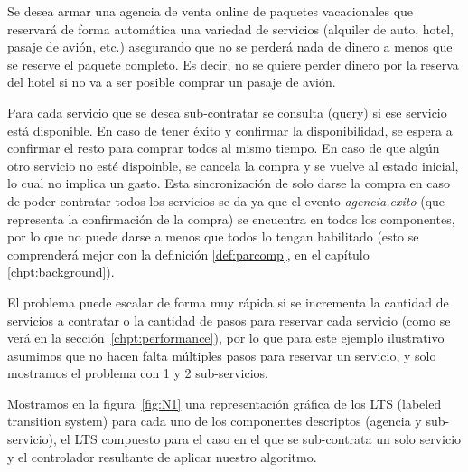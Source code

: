 Se desea armar una agencia de venta online de paquetes vacacionales que reservará de forma automática una variedad de servicios (alquiler de auto, hotel, pasaje de avión, etc.) asegurando que no se perderá nada de dinero a menos que se reserve el paquete completo. Es decir, no se quiere perder dinero por la reserva del hotel si no va a ser posible comprar un pasaje de avión.

Para cada servicio que se desea sub-contratar se consulta (query) si ese servicio está disponible. En caso de tener éxito y confirmar la disponibilidad, se espera a confirmar el resto para comprar todos al  mismo tiempo. En caso de que algún otro servicio no esté dispoinble, se cancela la compra y se vuelve al estado inicial, lo cual no implica un gasto. Esta sincronización de solo darse la compra en caso de poder contratar todos los servicios se da ya que el evento \textit{agencia.exito} (que representa la confirmación de la compra) se encuentra en todos los componentes, por lo que no puede darse a menos que todos lo tengan habilitado (esto se comprenderá mejor con la definición \ref{def:parcomp}, en el capítulo \ref{chpt:background}).

El problema puede escalar de forma muy rápida si se incrementa la cantidad de servicios a contratar o la cantidad de pasos para reservar cada servicio (como se verá en la sección~\ref{chpt:performance}), por lo que para este ejemplo ilustrativo asumimos que no hacen falta múltiples pasos para reservar un servicio, y solo mostramos el problema con 1 y 2 sub-servicios.

Mostramos en la figura~\ref{fig:N1} una representación gráfica de los LTS (labeled transition system) para cada uno de los componentes descriptos (agencia y sub-servicio), el LTS compuesto para el caso en el que se sub-contrata un solo servicio y el controlador resultante de aplicar nuestro algoritmo. 

